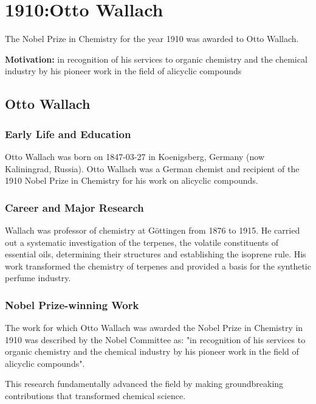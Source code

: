 \chapter{1910:Otto Wallach}
\label{chap:chemistry1910}

The Nobel Prize in Chemistry for the year 1910 was awarded to Otto Wallach.

\textbf{Motivation:}
in recognition of his services to organic chemistry and the chemical industry by his pioneer work in the field of alicyclic compounds

\section{Otto Wallach}

\subsection*{Early Life and Education}

Otto Wallach was born on 1847-03-27 in Koenigsberg, Germany (now Kaliningrad, Russia).
Otto Wallach was a German chemist and recipient of the 1910 Nobel Prize in Chemistry for his work on alicyclic compounds.

\subsection*{Career and Major Research}

Wallach was professor of chemistry at Göttingen from 1876 to 1915. He carried out a systematic investigation of the terpenes, the volatile constituents of essential oils, determining their structures and establishing the isoprene rule. His work transformed the chemistry of terpenes and provided a basis for the synthetic perfume industry.

\subsection*{Nobel Prize-winning Work}

The work for which Otto Wallach was awarded the Nobel Prize in Chemistry in 1910 was described by the Nobel Committee as: "in recognition of his services to organic chemistry and the chemical industry by his pioneer work in the field of alicyclic compounds".

This research fundamentally advanced the field by making groundbreaking contributions that transformed chemical science.

